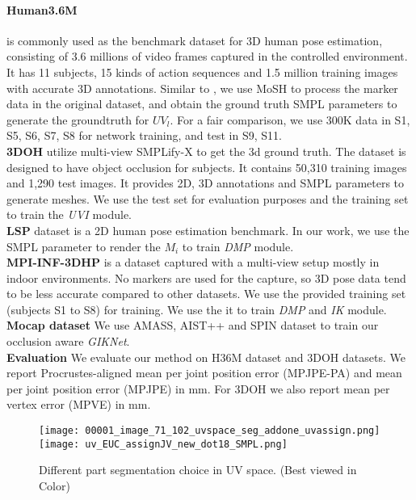 \documentclass[10pt,twocolumn,letterpaper]{article}
\begin{document}
 \paragraph{Human3.6M} \cite{h36m_pami}  is commonly used as the benchmark
dataset for 3D human pose estimation, consisting of 3.6 millions of video frames captured in the controlled environment. It has 11 subjects, 15 kinds of action sequences and 1.5 million training images with accurate 3D
annotations. Similar to \cite{HMR}, we use MoSH to process the marker data in the original dataset, and obtain the ground truth SMPL parameters to generate the groundtruth for $UV_l$. For a fair comparison, we use 300K data in S1, S5, S6, S7, S8 for network training, and test in S9, S11. 
\\
\textbf{3DOH} \cite{3DOH} utilize multi-view SMPLify-X \cite{SMPL-X:2019} to get the 3d ground truth. The dataset is designed to have object occlusion for subjects. It contains 50,310 training images and 1,290
test images. It provides 2D, 3D annotations and SMPL parameters to generate meshes. We use the test set for evaluation purposes and the training set to train the \textit{UVI} module. 
\\
\textbf{LSP} \cite{lsp} dataset is a 2D human pose estimation
benchmark. In our work, we use the \cite{up3d} SMPL parameter to render the $M_{i}$ to train \textit{DMP} module.
\\
\textbf{MPI-INF-3DHP} \cite{mono_3dhp2017} is a dataset captured with a multi-view
setup mostly in indoor environments. No markers are used for the capture, so 3D pose data tend to be less accurate compared to other datasets. We use the provided training
set (subjects S1 to S8) for training. We use the it to train \textit{DMP} and \textit{IK} module.
\\
\textbf{Mocap dataset} We use \cite{AMASS:ICCV:2019} AMASS, AIST++ \cite{aist++} and SPIN \cite{spin} dataset to train our occlusion aware \textit{GIKNet}. 
\\
\textbf{Evaluation} We evaluate our method on H36M \cite{h36m_pami} dataset and  3DOH \cite{3DOH} datasets. We report Procrustes-aligned mean per joint position error (MPJPE-PA) and mean per joint position error (MPJPE) in mm. For 3DOH we also report mean per vertex error (MPVE) in mm.

\begin{figure}
\centering
\texttt{[image: 00001\_image\_71\_102\_uvspace\_seg\_addone\_uvassign.png]}
\texttt{[image: uv\_EUC\_assignJV\_new\_dot18\_SMPL.png]}
\caption{{Different part segmentation choice in UV space. (Best viewed in Color) }}
\label{fig:uvpartseg14and24}
\end{figure}
\end{document}
